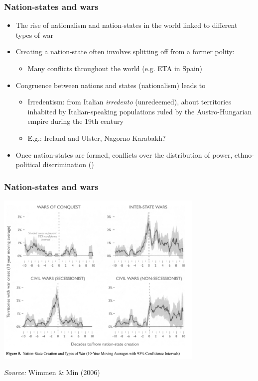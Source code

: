 \documentclass[aspectratio=43]{beamer}
\begin{document}
\begin{frame}
\frametitle{Nation-states and wars}
\centering

\begin{itemize}[<+->]
  \item The rise of nationalism and nation-states in the world linked to different types of war
  \item Creating a nation-state often involves splitting off from a former polity: 
  \begin{itemize}
    \item Many conflicts throughout the world (e.g. ETA in Spain)
  \end{itemize}
  \item Congruence between nations and states (nationalism) leads to 
  \begin{itemize}
    \item Irredentism: from Italian \textit{irredento} (unredeemed), about territories inhabited by Italian-speaking populations ruled by the Austro-Hungarian empire during the 19th century
    \item E.g.: Ireland and Ulster, Nagorno-Karabakh?
  \end{itemize}
  \item Once nation-states are formed, conflicts over the distribution of power, ethno-political discrimination ()
\end{itemize}

\end{frame}

\begin{frame}
\frametitle{Nation-states and wars}
\centering

\includegraphics[width = 0.75\textwidth]{img/wimmer_min_fig5}

{\scriptsize \textit{Source:} Wimmen \& Min (2006)}

\end{frame}
\end{document}
